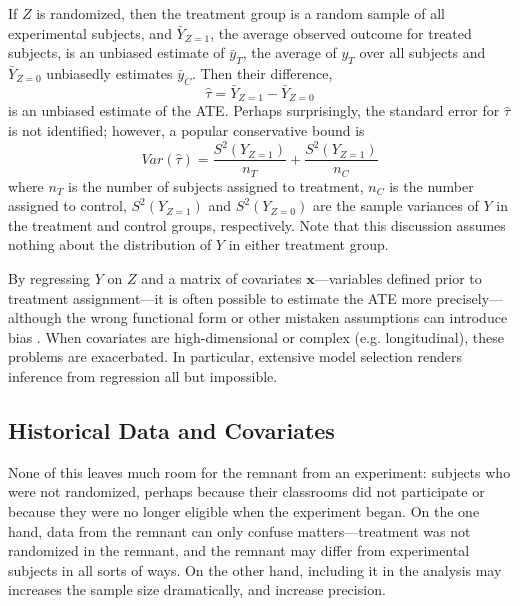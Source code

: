 \documentclass{edm_template}
\newcommand{\tauhat}{\hat{\tau}}
\begin{document}
If $Z$ is randomized, then the treatment group is a random sample of all experimental subjects, and $\bar{Y}_{Z=1}$, the average observed outcome for treated subjects, is an unbiased estimate of $\bar{y}_T$, the average of $y_T$ over all subjects and $\bar{Y}_{Z=0}$ unbiasedly estimates $\bar{y}_C$. Then their difference, 
\begin{equation}\label{eq:tauEst}
\tauhat=\bar{Y}_{Z=1}-\bar{Y}_{Z=0}
\end{equation}
is an unbiased estimate of the ATE. 
Perhaps surprisingly, the standard error for $\tauhat$ is not identified; however, a popular conservative bound \cite{neyman} is
\begin{equation}\label{eq:tauSE}
Var(\tauhat)=\frac{S^2(Y_{Z=1})}{n_T}+\frac{S^2(Y_{Z=1})}{n_C}
\end{equation}
where $n_T$ is the number of subjects assigned to treatment, $n_C$ is the number assigned to control, $S^2(Y_{Z=1})$ and $S^2(Y_{Z=0})$ are the sample variances of $Y$ in the treatment and control groups, respectively. 
Note that this discussion assumes nothing about the distribution of $Y$ in either treatment group. 

By regressing $Y$ on $Z$ and a matrix of covariates $\bm{x}$---variables defined prior to treatment assignment---it is often possible to estimate the ATE more precisely---although the wrong functional form or other mistaken assumptions can introduce bias \cite{freedman}.  
When covariates are high-dimensional or complex (e.g. longitudinal), these problems are exacerbated. 
In particular, extensive model selection renders inference from regression all but impossible. 

\subsection{Historical Data and Covariates} 
None of this leaves much room for the remnant from an experiment: subjects who were not randomized, perhaps because their classrooms did not participate or because they were no longer eligible when the experiment began. 
On the one hand, data from the remnant can only confuse matters---treatment was not randomized in the remnant, and the remnant may differ from experimental subjects in all sorts of ways. 
On the other hand, including it in the analysis may increases the sample size dramatically, and increase precision.
\end{document}
